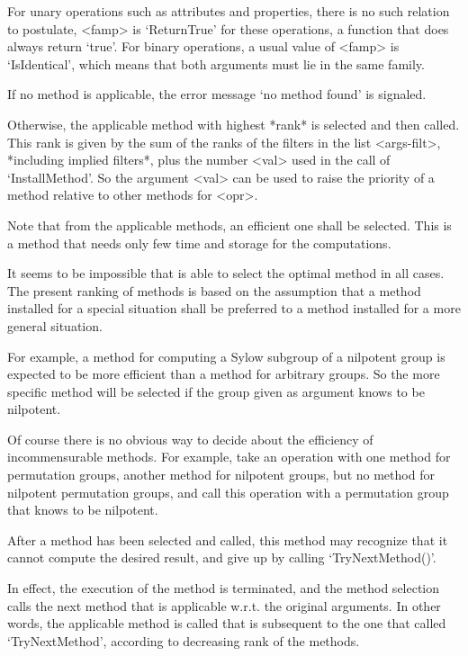 For unary operations such as attributes and properties,
there is no such relation to postulate,
<famp> is `ReturnTrue' for these operations,
a function that does always return `true'.
For binary operations, a usual value of <famp> is `IsIdentical',
which means that both arguments must lie in the same family.

If no method is applicable,
the error message `no method found' is signaled.

Otherwise, the applicable method with highest *rank* is selected and then
called.
This rank is given by the sum of the ranks of the filters in the list
<args-filt>,
*including implied filters*,
plus the number <val> used in the call of `InstallMethod'.
So the argument <val> can be used to raise the priority of a method
relative to other methods for <opr>.

Note that from the applicable methods,
an efficient one shall be selected.
This is a method that needs only few time and storage for the
computations.

It seems to be impossible that {\GAP} is able to select the optimal
method in all cases.
The present ranking of methods is based on the assumption
that a method installed for a special situation shall be preferred
to a method installed for a more general situation.

For example, a method for computing a Sylow subgroup of a nilpotent
group is expected to be more efficient than a method for arbitrary
groups.
So the more specific method will be selected if the group given as
argument knows to be nilpotent.

Of course there is no obvious way to decide about the efficiency of
incommensurable methods.
For example, take an operation with one method for permutation groups,
another method for nilpotent groups,
but no method for nilpotent permutation groups,
and call this operation with a permutation group that knows to be
nilpotent.


After a method has been selected and called,
this method may recognize that it cannot compute the desired result,
and give up by calling `TryNextMethod()'.

In effect, the execution of the method is terminated,
and the method selection calls the next method that is applicable w.r.t.
the original arguments.
In other words, the applicable method is called that is subsequent to the
one that called `TryNextMethod',
according to decreasing rank of the methods.

